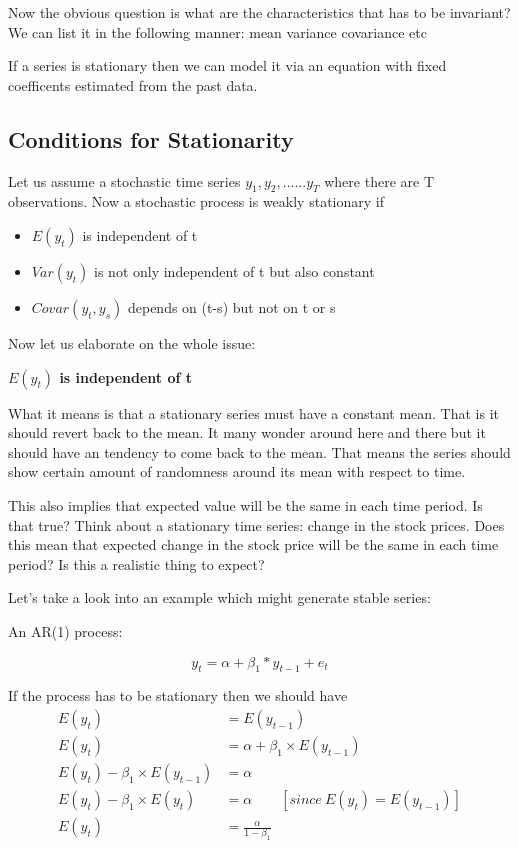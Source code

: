 \documentclass{book}
\begin{document}
Now the obvious question is what are the characteristics that has to be invariant? We can list it in the following manner:
 mean
 variance
 covariance  etc
 
 If a series is stationary then we can model it via an equation with fixed coefficents estimated from the past data. 
 
\subsection{Conditions for Stationarity}
 Let us assume a stochastic time series $y_1, y_2, ...... y_T$ where there are T observations. Now a stochastic process is weakly stationary if
 
 \begin{itemize}
    \item $ E(y_t)$ is independent of t 
    \item $Var(y_t)$ is not only independent of t but also constant 
    \item $Covar(y_t, y_s)$ depends on (t-s) but not on t or s 
 \end{itemize}
 
Now let us elaborate on the whole issue:
 
 \textbf{\normalsize{$E(y_t)$ is independent of t}} 

What it means is that a stationary series must have a constant mean. That is it should revert back to the mean. It many wonder around here and there but it should have an tendency to come back to the mean. That means the series should show certain amount of randomness around its mean with respect to time. 
 
 This also implies that expected value will be the same in each time period. Is that true? Think about a stationary time series: change in the stock prices. Does this mean that expected change in the stock price will be the same in each time period? Is this a realistic thing to expect?
 
 Let's take a look into an example which might generate stable series:
 
 An AR(1) process:
 
 $$y_t=\alpha+\beta_1*y_{t-1}+e_t $$
 
 If the process has to be stationary then we should have
 \begin{align*}
 E(y_t)&=E(y_{t-1}) \\
 E(y_t)&=\alpha+\beta_1 \times E(y_{t-1})\\
 E(y_t)-\beta_1 \times E(y_{t-1})&=\alpha \\
 E(y_t)-\beta_1 \times E(y_t)&=\alpha \qquad [since~ E(y_t)=E(y_{t-1})] \\
 E(y_t)&=\frac{\alpha}{1-\beta_1}
 \end{align*}
 
\end{document}
